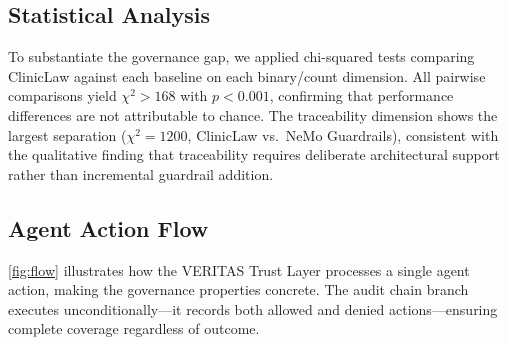 \documentclass{article}
\begin{document}
\subsection{Statistical Analysis}

To substantiate the governance gap, we applied chi-squared tests
\cite{cochran1952chisquared} comparing ClinicLaw against each baseline on each
binary/count dimension. All pairwise comparisons yield $\chi^2 > 168$ with
$p < 0.001$, confirming that performance differences are not attributable to
chance. The traceability dimension shows the largest separation
($\chi^2 = 1200$, ClinicLaw vs.\ NeMo Guardrails), consistent with the
qualitative finding that traceability requires deliberate architectural support
rather than incremental guardrail addition.

\subsection{Agent Action Flow}

\cref{fig:flow} illustrates how the VERITAS Trust Layer processes a single
agent action, making the governance properties concrete. The audit chain branch
executes unconditionally---it records both allowed and denied actions---ensuring
complete coverage regardless of outcome.
\end{document}

